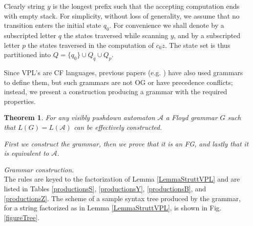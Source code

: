 \documentclass[3p,11pt]{elsarticle}
\newtheorem{theorem}{Theorem}[section]
\newenvironment{proof}[1][Proof]{\begin{trivlist}
\item[\hskip \labelsep {\bfseries #1}]}{\end{trivlist}}
\begin{document}
Clearly  string $y$ is the longest prefix such that the accepting computation ends with empty stack. For simplicity, without loss of generality, we assume that no transition enters the initial state $q_0$. For convenience we shall denote by a subscripted letter $q$ the states traversed while scanning $y$, and by a subscripted letter $p$ the states traversed in the computation of $c_0z$. The state set is thus partitioned into $Q= \{q_0\}\cup Q_q \cup Q_p$.
\par
Since VPL's are CF languages, previous papers (e.g. \cite{LaTorreNP06}) have also used grammars to define them,
 but such grammars are not OG or have precedence conflicts; instead, we present a construction producing a grammar with the required properties.
\begin{theorem}\label{TheorVPD2OPG}
For any  visibly pushdown automaton $\mathcal{A}$ a Floyd grammar $G$ such that $L(G)=L(\mathcal{A})$ can be effectively constructed.
\begin{proof}
 First we construct the grammar, then we prove that it is an FG, and lastly that it is equivalent to $\mathcal{A}$.
\end{proof}
\end{theorem}
\emph{Grammar construction}.\label{OPGgrammarConstr}
\\
 The rules are keyed to the factorization of Lemma \ref{LemmaStruttVPL} and are listed in Tables \ref{productionsS}, \ref{productionsY},  \ref{productionsB}, and \ref{productionsZ}. The scheme of a sample syntax tree produced by the grammar, for a string factorized as in Lemma \ref{LemmaStruttVPL}, is shown in Fig. \ref{figureTree}.
\end{document}
